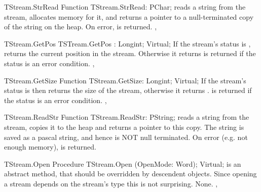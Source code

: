 \begin{function}{TStream.StrRead}
\Declaration
Function TStream.StrRead: PChar;
\Description
{} reads a string from the stream, allocates memory
for it, and returns a pointer to a null-terminated copy of the string
on the heap.
\Errors
On error,  is returned.
\SeeAlso
{}, 
\end{function}

\html{}


\begin{function}{TStream.GetPos}
\Declaration 
TSTream.GetPos : Longint; Virtual;
\Description
If the stream's status is ,  returns the current 
position in the stream. Otherwise it returns 
\Errors
{} is returned if the status is an error condition.
\SeeAlso
{}, 
\end{function}

\html{}


\begin{function}{TStream.GetSize}
\Declaration
Function TStream.GetSize: Longint; Virtual;
\Description
If the stream's status is  then  returns
the size of the stream, otherwise it returns .
\Errors
{} is returned if the status is an error condition.
\SeeAlso
{}, 
\end{function}

\html{}


\begin{function}{TStream.ReadStr}
\Declaration
Function TStream.ReadStr: PString;
\Description
{} reads a string from the stream, copies it to the heap
and returns a pointer to this copy. The string is saved as a pascal
string, and hence is NOT null terminated.
\Errors
On error (e.g. not enough memory),  is returned.
\SeeAlso
{}
\end{function}

\html{}

\begin{procedure}{TStream.Open}
\Declaration
Procedure TStream.Open (OpenMode: Word); Virtual;
\Description
{} is an abstract method, that should be overridden by descendent
objects. Since opening a stream depends on the stream's type this is not
surprising.
\Errors
None.
\SeeAlso
{}, 
\end{procedure}

